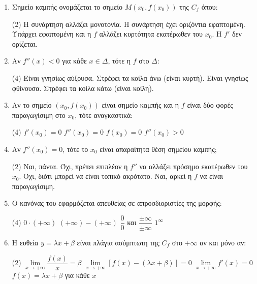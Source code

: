 \begin{enumerate}[label=\textbf{2.\arabic*.}, itemsep=4mm]
    \item Σημείο καμπής ονομάζεται το σημείο $M(x_0, f(x_0))$ της $C_f$ όπου:
    \begin{tasks}[label=\let\textdexiakeraia\relax\alph*.](2)
        \task Η συνάρτηση αλλάζει μονοτονία.
        \task Η συνάρτηση έχει οριζόντια εφαπτομένη.
        \task Υπάρχει εφαπτομένη και η $f$ αλλάζει κυρτότητα εκατέρωθεν του $x_0$.
        \task Η $f'$ δεν ορίζεται.
    \end{tasks}

    \item Αν $f''(x) < 0$ για κάθε $x \in \Delta$, τότε η $f$ στο $\Delta$:
    \begin{tasks}[label=\let\textdexiakeraia\relax\alph*.](4)
        \task Είναι γνησίως αύξουσα.
        \task Στρέφει τα κοίλα άνω (είναι κυρτή).
        \task Είναι γνησίως φθίνουσα.
        \task Στρέφει τα κοίλα κάτω (είναι κοίλη).
    \end{tasks}

    \item Αν το σημείο $(x_0, f(x_0))$ είναι σημείο καμπής και η $f$ είναι δύο φορές παραγωγίσιμη στο $x_0$, τότε αναγκαστικά:
    \begin{tasks}[label=\let\textdexiakeraia\relax\alph*.](4)
        \task $f'(x_0) = 0$
        \task $f''(x_0) = 0$
        \task $f(x_0) = 0$
        \task $f''(x_0) > 0$
    \end{tasks}

    \item Αν $f''(x_0) = 0$, τότε το $x_0$ είναι απαραίτητα θέση σημείου καμπής;
    \begin{tasks}[label=\let\textdexiakeraia\relax\alph*.](2)
        \task Ναι, πάντα.
        \task Όχι, πρέπει επιπλέον η $f''$ να αλλάζει πρόσημο εκατέρωθεν του $x_0$.
        \task Όχι, διότι μπορεί να είναι τοπικό ακρότατο.
        \task Ναι, αρκεί η $f$ να είναι παραγωγίσιμη.
    \end{tasks}

    \item Ο κανόνας του  εφαρμόζεται απευθείας σε απροσδιοριστίες της μορφής:
    \begin{tasks}[label=\let\textdexiakeraia\relax\alph*.](4)
        \task $0 \cdot (+\infty)$
        \task $(+\infty) - (+\infty)$
        \task $\dfrac{0}{0}$ και $\dfrac{\pm \infty}{\pm \infty}$
        \task $1^\infty$
    \end{tasks}

    \item Η ευθεία $y = \lambda x + \beta$ είναι πλάγια ασύμπτωτη της $C_f$ στο $+\infty$ αν και μόνο αν:
    \begin{tasks}[label=\let\textdexiakeraia\relax\alph*.](2)
        \task $\lim\limits_{x \to +\infty} \dfrac{f(x)}{x} = \beta$
        \task $\lim\limits_{x \to +\infty} [f(x) - (\lambda x + \beta)] = 0$
        \task $\lim\limits_{x \to +\infty} f'(x) = 0$
        \task $f(x) = \lambda x + \beta$ για κάθε $x$
    \end{tasks}


\end{enumerate}
